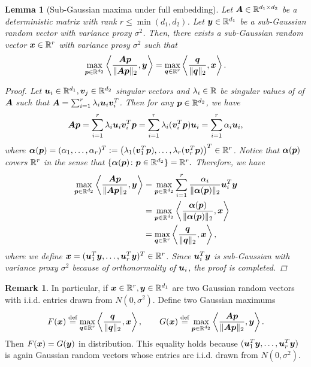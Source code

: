 \documentclass[12pt]{article}
\newtheorem{lem}{Lemma}
\theoremstyle{definition}
\newtheorem{rmk}{Remark}
\begin{document}
\begin{lem}[Sub-Gaussian maxima under full embedding]\label{lem:embedding}
Let $\bm A\in\mathbb{R}^{d_1\times d_2}$ be a deterministic matrix with rank $r\leq\min(d_1,d_2)$. Let $\bm{y}\in\mathbb{R}^{d_1}$ be a sub-Gaussian random vector with variance proxy $\sigma^2$. Then, there exists a sub-Gaussian random vector $\bm x\in\mathbb{R}^r$  with variance prosy $\sigma^2$ such that  
\begin{align}
    \max_{\bm{p}\in\mathbb{R}^{d_2}}\left\langle \frac{\bm A\bm{p}}{\|\bm A\bm{p}\|_2},\bm{y}\right\rangle = \max_{\bm{q}\in\mathbb{R}^r}\left\langle \frac{\bm{q}}{\|\bm{q}\|_2},\bm x\right\rangle.
\end{align}
\begin{proof}
Let $\bm{u}_i\in\mathbb{R}^{d_1},\bm{v}_j\in\mathbb{R}^{d_2}$ singular vectors and $\lambda_i\in\mathbb{R}$ be singular values of of $\bm A$ such that
 $\bm A = \sum_{i=1}^r \lambda_i\bm{u}_i\bm{v}_i^T$.
Then  for any $\bm{p}\in\mathbb{R}^{d_2}$, we have 
\begin{align}
    \bm A\bm{p} = \sum_{i=1}^r\lambda_i \bm{u}_i\bm{v}_i^T\bm{p} = \sum_{i=1}^r \lambda_i(\bm{v}_i^T\bm{p}) \bm{u}_i = \sum_{i = 1}^r \alpha_i\bm{u}_i,
\end{align}
where $\boldsymbol{\alpha}(\bm{p}) = (\alpha_1,\ldots,\alpha_r)^T := \left(\lambda_1(\bm{v}_1^T\bm{p}),\ldots,\lambda_r(\bm{v}_r^T\bm{p})\right)^T\in\mathbb{R}^{r}$. Notice that $\boldsymbol{\alpha}(\bm{p})$ covers $\mathbb{R}^r$ in the sense that $\{\boldsymbol{\alpha}(\bm{p})\colon \bm{p}\in\mathbb{R}^{d_2}\} = \mathbb{R}^r.$
Therefore, we have 
\begin{align}
    \max_{\bm{p}\in\mathbb{R}^{d_2}}\left\langle \frac{\bm A\bm{p}}{\|\bm A\bm{p}\|_2},\bm{y}\right\rangle &=\max_{\bm{p}\in\mathbb{R}^{d_2}}\sum_{i=1}^r\frac{\alpha_i}{\|\boldsymbol{\alpha}(\bm{p})\|_2}\bm{u}_i^T\bm{y}\\&=\max_{\bm{p}\in\mathbb{R}^{d_2}}\left\langle \frac{\boldsymbol{\alpha}(\bm{p})}{\|\boldsymbol{\alpha}(\bm{p})\|_2},\bm x\right\rangle\\&=\max_{\bm{q}\in\mathbb{R}^r}\left\langle \frac{\bm{q}}{\|\bm{q}\|_2},\bm x\right\rangle,
\end{align}
where we define $\bm x = (\bm{u}_1^T\bm{y},\ldots,\bm{u}_r^T\bm{y})^T\in\mathbb{R}^{r}$. Since $\bm{u}_i^T\bm{y}$ is sub-Gaussian with variance proxy $\sigma^2$ because of orthonormality of $\bm{u}_i$, the proof is completed.
\end{proof}
\end{lem}
\begin{rmk} In particular, if $\bm x \in\mathbb{R}^r,\bm{y}\in\mathbb{R}^{d_1}$ are two Gaussian random vectors with i.i.d. entries drawn from $N(0,\sigma^2)$.
Define two Gaussian maximums 
\begin{align}
    F(\bm x)\stackrel{\text{def}}{=}\max_{\bm{q}\in\mathbb{R}^r}\left\langle \frac{\bm{q}}{\|\bm{q}\|_2},\bm x\right\rangle,\quad\quad G(\bm x)\stackrel{\text{def}}{=}\max_{\bm{p}\in\mathbb{R}^{d_2}}\left\langle \frac{\bm A\bm{p}}{\|\bm A\bm{p}\|_2},\bm{y}\right\rangle.
\end{align}
Then $F(\bm x) = G(\bm{y})$ in distribution. This equality holds because $(\bm{u}_1^T\bm{y},\ldots,\bm{u}_r^T\bm{y})$ is again Gaussian random vectors whose entries are i.i.d. drawn from $N(0,\sigma^2).$
\end{rmk}
\end{document}
